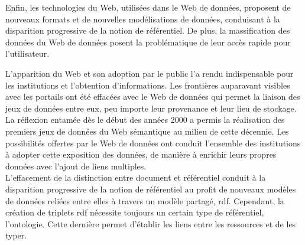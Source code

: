 Enfin, les technologies du Web, utilisées dans le Web de données, proposent de nouveaux formats et de nouvelles modélisations de données, conduisant à la disparition progressive de la notion de référentiel. De plus, la massification des données du Web de données posent la problématique de leur accès rapide pour l'utilisateur.





\bigskip
\bigskip
\bigskip
L'apparition du Web et son adoption par le public l'a rendu indispensable pour les institutions et l'obtention d'informations. Les frontières auparavant visibles avec les portails ont été effacées avec le Web de données qui permet la liaison des jeux de données entre eux, peu importe leur provenance et leur lieu de stockage. La réflexion entamée dès le début des années 2000 a permis la réalisation des premiers jeux de données du Web sémantique au milieu de cette décennie. Les possibilités offertes par le Web de données ont conduit l'ensemble des institutions à adopter cette exposition des données, de manière à enrichir leurs propres données avec l'ajout de liens multiples.\\

L'effacement de la distinction entre document et référentiel conduit à la disparition progressive de la notion de référentiel au profit de nouveaux modèles de données reliées entre elles à travers un modèle partagé, \ac{rdf}. Cependant, la création de triplets \ac{rdf} nécessite toujours un certain type de référentiel, l'ontologie. Cette dernière permet d'établir les liens entre les ressources et de les typer.